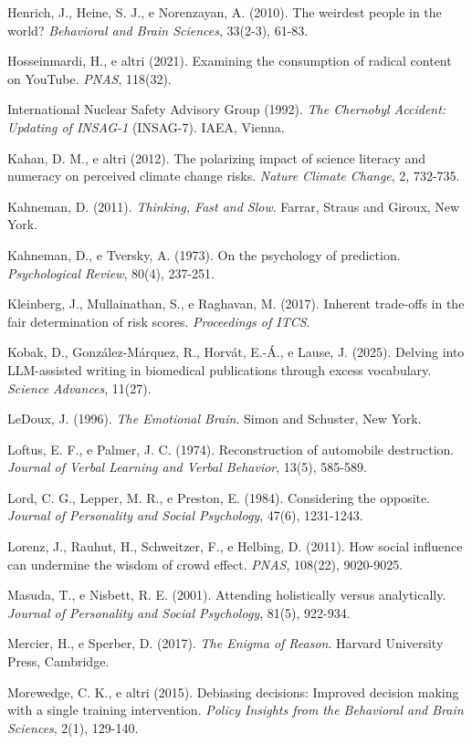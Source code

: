 Henrich, J., Heine, S. J., e Norenzayan, A. (2010). The weirdest people in the world? \textit{Behavioral and Brain Sciences}, 33(2-3), 61-83.

Hosseinmardi, H., e altri (2021). Examining the consumption of radical content on YouTube. \textit{PNAS}, 118(32).

International Nuclear Safety Advisory Group (1992). \textit{The Chernobyl Accident: Updating of INSAG-1} (INSAG-7). IAEA, Vienna.

Kahan, D. M., e altri (2012). The polarizing impact of science literacy and numeracy on perceived climate change risks. \textit{Nature Climate Change}, 2, 732-735.

Kahneman, D. (2011). \textit{Thinking, Fast and Slow}. Farrar, Straus and Giroux, New York.

Kahneman, D., e Tversky, A. (1973). On the psychology of prediction. \textit{Psychological Review}, 80(4), 237-251.

Kleinberg, J., Mullainathan, S., e Raghavan, M. (2017). Inherent trade-offs in the fair determination of risk scores. \textit{Proceedings of ITCS}.

Kobak, D., González-Márquez, R., Horvát, E.-Á., e Lause, J. (2025). Delving into LLM-assisted writing in biomedical publications through excess vocabulary. \textit{Science Advances}, 11(27).

LeDoux, J. (1996). \textit{The Emotional Brain}. Simon and Schuster, New York.

Loftus, E. F., e Palmer, J. C. (1974). Reconstruction of automobile destruction. \textit{Journal of Verbal Learning and Verbal Behavior}, 13(5), 585-589.

Lord, C. G., Lepper, M. R., e Preston, E. (1984). Considering the opposite. \textit{Journal of Personality and Social Psychology}, 47(6), 1231-1243.

Lorenz, J., Rauhut, H., Schweitzer, F., e Helbing, D. (2011). How social influence can undermine the wisdom of crowd effect. \textit{PNAS}, 108(22), 9020-9025.

Masuda, T., e Nisbett, R. E. (2001). Attending holistically versus analytically. \textit{Journal of Personality and Social Psychology}, 81(5), 922-934.

Mercier, H., e Sperber, D. (2017). \textit{The Enigma of Reason}. Harvard University Press, Cambridge.

Morewedge, C. K., e altri (2015). Debiasing decisions: Improved decision making with a single training intervention. \textit{Policy Insights from the Behavioral and Brain Sciences}, 2(1), 129-140.

